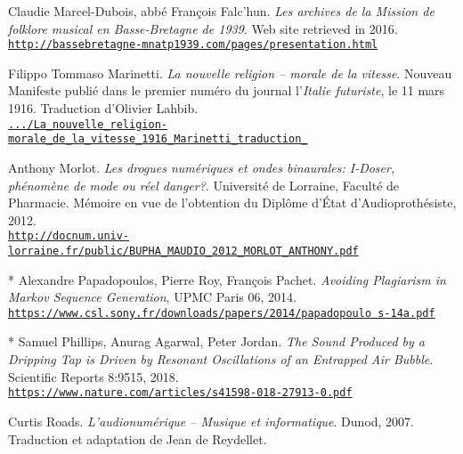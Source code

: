 \begin{thebibliography}{99}
	Claudie Marcel-Dubois, abb\'e François Falc'hun. \textit{Les archives de la Mission de folklore musical en Basse-Bretagne de 1939}. Web site retrieved in 2016.\\ 
	\href{http://bassebretagne-mnatp1939.com/pages/presentation.html}{\scriptsize{\texttt{http://bassebretagne-mnatp1939.com/pages/presentation.html}}} \normalsize{}
	
	Filippo Tommaso Marinetti. \textit{La nouvelle religion -- morale de la vitesse}. Nouveau Manifeste publié dans le premier numéro du journal l'\textit{Italie futuriste}, le 11 mars 1916. Traduction d'Olivier Lahbib.\\ 
	\href{https://www.academia.edu/12024655/La\_nouvelle\_religion-morale\_de\_la\_vitesse\_1916\_Marinetti\_traduction\_}{\scriptsize{\texttt{.../La\_nouvelle\_religion-morale\_de\_la\_vitesse\_1916\_Marinetti\_traduction\_}}} \normalsize{}
	
	
	Anthony Morlot. \textit{Les drogues num\'eriques et ondes
binaurales: I-Doser, ph\'enom\`ene de mode ou r\'eel danger?}. Universit\'e de Lorraine, Facult\'e de Pharmacie. M\'emoire en vue de l'obtention du Dipl\^ome d'\'Etat d'Audioproth\'esiste, 2012.\\ 
	\href{http://docnum.univ-lorraine.fr/public/BUPHA\_MAUDIO\_2012\_MORLOT\_ANTHONY.pdf}{\scriptsize{\texttt{http://docnum.univ-lorraine.fr/public/BUPHA\_MAUDIO\_2012\_MORLOT\_ANTHONY.pdf}}} \normalsize{}
	
	* Alexandre Papadopoulos, Pierre Roy, Fran\c cois Pachet. \textit{Avoiding Plagiarism in Markov Sequence Generation}, UPMC Paris 06, 2014.\\ \href{https://www.csl.sony.fr/downloads/papers/2014/papadopoulo s-14a.pdf}{\scriptsize{\texttt{https://www.csl.sony.fr/downloads/papers/2014/papadopoulo s-14a.pdf}}} \normalsize{}
	
	* Samuel Phillips,  Anurag Agarwal, Peter Jordan. \textit{The Sound Produced by a Dripping Tap is Driven by Resonant Oscillations of an Entrapped Air Bubble}. Scientific Reports 8:9515, 2018.\\ 
	\href{https://www.nature.com/articles/s41598-018-27913-0}{\scriptsize{\texttt{https://www.nature.com/articles/s41598-018-27913-0.pdf}}} \normalsize{}
	
	Curtis Roads. \textit{L'audionumérique -- Musique et informatique}. Dunod, 2007. Traduction et adaptation de Jean de Reydellet.
	

\end{thebibliography}
